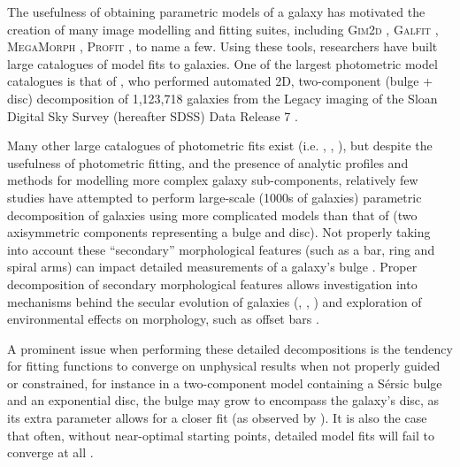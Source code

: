 \documentclass[trackchanges]{aastex63}
\begin{document}
The usefulness of obtaining parametric models of a galaxy has motivated the creation of many image modelling and fitting suites, including \textsc{Gim2d} \citep{Simard2002:astro-ph/0205025v2}, \textsc{Galfit} \citep{galfit-paper}, \textsc{MegaMorph} \citep{megamorph-paper}, \textsc{Profit} \citep{profit-paper},  to name a few. Using these tools, researchers have built large catalogues of model fits to galaxies. One of the largest photometric model catalogues is that of \citet{2011ApJS..196...11S}, who performed automated 2D, two-component (bulge + disc) decomposition of 1,123,718 galaxies from the Legacy imaging of the Sloan Digital Sky Survey (hereafter SDSS) Data Release 7 \citep{SDSSDR7}.

Many other large catalogues of photometric fits exist (i.e. \citealt{2012MNRAS.421.2277L}, \citealt{2012MNRAS.421.1007K}, \citealt{2012ApJS..203...24V}), but despite the usefulness of photometric fitting, and the presence of analytic profiles and methods for modelling more complex galaxy sub-components, relatively few studies have attempted to perform large-scale (1000s of galaxies) parametric decomposition of galaxies using more complicated models than that of \citet{2011ApJS..196...11S} (two axisymmetric components representing a bulge and disc). Not properly taking into account these ``secondary'' morphological features (such as a bar, ring and spiral arms) can impact detailed measurements of a galaxy's bulge \citep{Gao2017:1709.00746v1}. Proper decomposition of secondary morphological features allows investigation into mechanisms behind the secular evolution of galaxies (\citealt{2015MNRAS.453.3729H}, \citealt{2018MNRAS.473.4731K}, \citealt{2018ApJ...862..100G}) and exploration of environmental effects on morphology, such as offset bars \citep{2017MNRAS.469.3363K}.

A prominent issue when performing these detailed decompositions is the tendency for fitting functions to converge on unphysical results when not properly guided or constrained, for instance in a two-component model containing a S\'ersic  bulge and an exponential disc, the bulge may grow to encompass the galaxy's disc, as its extra parameter allows for a closer fit (as observed by  \citealt{2018MNRAS.473.4731K}). It is also the case that often, without near-optimal starting points, detailed model fits will fail to converge at all \citep{2016MNRAS.462.1470L}.
\end{document}
